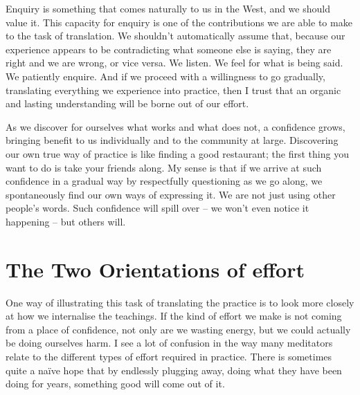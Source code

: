 Enquiry is something that comes naturally to us in the West, and we
should value it. This capacity for enquiry is one of the contributions
we are able to make to the task of translation. We shouldn't
automatically assume that, because our experience appears to be
contradicting what someone else is saying, they are right and we are
wrong, or vice versa. We listen. We feel for what is being said. We
patiently enquire. And if we proceed with a willingness to go gradually,
translating everything we experience into practice, then I trust that an
organic and lasting understanding will be borne out of our effort.

As we discover for ourselves what works and what does not, a confidence
grows, bringing benefit to us individually and to the community at
large. Discovering our own true way of practice is like finding a good
restaurant; the first thing you want to do is take your friends along.
My sense is that if we arrive at such confidence in a gradual way by
respectfully questioning as we go along, we spontaneously find our own
ways of expressing it. We are not just using other people's words. Such
confidence will spill over -- we won't even notice it happening -- but
others will.

\section{The Two Orientations of effort}

One way of illustrating this task of translating the practice is to look
more closely at how we internalise the teachings. If the kind of effort
we make is not coming from a place of confidence, not only are we
wasting energy, but we could actually be doing ourselves harm. I see a
lot of confusion in the way many meditators relate to the different
types of effort required in practice. There is sometimes quite a naïve
hope that by endlessly plugging away, doing what they have been doing
for years, something good will come out of it.

